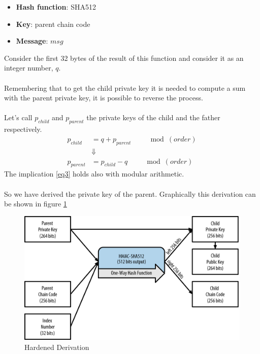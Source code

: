 \begin{itemize}[label=$\odot$]
	\item \textbf{Hash function}: SHA512
	\item \textbf{Key}: parent chain code
	\item \textbf{Message}: $msg$
\end{itemize}
Consider the first 32 bytes of the result of this function and consider it as an integer number, $q$.
\\ \\
Remembering that to get the child private key it is needed to compute a sum with the parent private key, it is possible to reverse the process. \\ \\
Let's call $p_{child}$ and $p_{parent}$ the private keys of the child and the father respectively.
\begin{equation}\label{eq3}
\begin{split}
p_{child} &= q+p_{parent} \qquad \mod (order) \\
&\Downarrow \\
p_{parent} &=p_{child}-q \qquad \mod (order)
\end{split}
\end{equation}
The implication \ref{eq3} holds also with modular arithmetic.
\\ \\
So we have derived the private key of the parent. Graphically this derivation can be shown in figure \ref{fig:from_child_to_parent}
\begin{figure}[ht!]
	\centering
	\includegraphics[width=15cm]{Figures/hardened_derivation.png} %
	\caption{Hardened Derivation }
	\label{fig:from_child_to_parent}
\end{figure}

 
